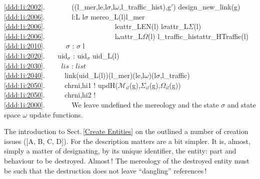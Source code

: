 {\ref{ddd:1i:2002}.\ \ \ \ \ \ \  ((l\_mer,le,l$\sigma$,l$\omega$,l\_traffic\_hist),g$'$) {\EQ} design\_new\_link(g)  \\
\ref{ddd:1i:2006}.\ \ \ \ \ \ \  l:L {\RDOT} l{\NOTISIN}$\sigma$ {\RDOT} mereo\_L(l){\EQ}l\_mer {\WEDGE} \\
\ref{ddd:1i:2006}.\ \ \ \ \ \ \ \ \ \ \ \ \ \ \ \ \ \ \ \ le{\EQ}attr\_LEN(l) {\WEDGE} l$\sigma${\EQ}attr\_L$\Sigma$(l) {\WEDGE} \\
\ref{ddd:1i:2006}.\ \ \ \ \ \ \ \ \ \ \ \ \ \ \ \ \ \ \ \ l$\omega${\EQ}attr\_L$\Omega$(l) {\WEDGE} l\_traffic\_hist{\EQ}attr\_HTraffic(l) \\
\ref{ddd:1i:2010}.\ \ \ \ \ \ $\sigma$ :{\EQ} $\sigma$ {\UNION} {\LBRACE}l{\RBRACE} \\
\ref{ddd:1i:2020}.\ \ \ {\PARL} uid$_{\sigma}$ :{\EQ} uid$_{\sigma}$ {\UNION} {\LBRACE}uid\_L(l){\RBRACE}\\
\ref{ddd:1i:2030}.\ \ \ \ {\PARL} $lis$ :{\EQ} $list$ {\UNION} {\LBRACE}{\RBRACE}\\
\ref{ddd:1i:2040}.\ \ \ \ \ {\PARL} link(uid\_L(l))(l\_mer)(le,l$\omega$)(l$\sigma$,l\_traffic)\\
\ref{ddd:1i:2050}.\ \ \ \ \ {\PARL} ch{\LBRACKET}{\LBRACE}rni,hi1{\RBRACE}{\RBRACKET} ! updH($\mathcal{M}_{il}$(g),$\Sigma_{il}$(g),$\Omega_{il}$(g))\\
\ref{ddd:1i:2050}.\ \ \ \ \ {\PARL} ch{\LBRACKET}{\LBRACE}rni,hi2{\RBRACE}{\RBRACKET} ! \\
\ref{ddd:1i:2000}.\ \ \ \ \ \ \   \dbsquare
\ep
\noindent
\begynd
\pind We leave undefined the mereology and the state $\sigma$ and
      state space $\omega$ \textsf{upd}ate functions.
\afslut
}

\label{Destroy Entities}

\begynd
\pind The introduction to Sect.\,\vref{Create Entities} \nyl on the 
\begynd
\pind outlined a number of creation issues ([A, B, C, D]).
\afslut
\pind For the 
\begynd
\pind description matters are a bit simpler.
\afslut
\pind It is, almost, simply a matter
\begynd
\pind of designating, by its unique identifier,
\pind the entity: part and behaviour to be destroyed.
\afslut
\pind Almost\,!
\begynd
\pind The mereology of the destroyed entity
\pind must be such that the destruction
\pind does not leave ``dangling'' references\,!
\afslut
\afslut

\mnewfoil

